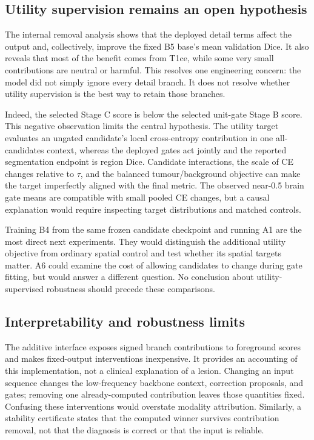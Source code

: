 \documentclass[conference]{IEEEtran}
\begin{document}
\subsection{Utility supervision remains an open hypothesis}
The internal removal analysis shows that the deployed detail terms affect the output and, collectively, improve the fixed B5 base's mean validation Dice. It also reveals that most of the benefit comes from T1ce, while some very small contributions are neutral or harmful. This resolves one engineering concern: the model did not simply ignore every detail branch. It does not resolve whether utility supervision is the best way to retain those branches.

Indeed, the selected Stage C score is below the selected unit-gate Stage B score. This negative observation limits the central hypothesis. The utility target evaluates an ungated candidate's local cross-entropy contribution in one all-candidates context, whereas the deployed gates act jointly and the reported segmentation endpoint is region Dice. Candidate interactions, the scale of CE changes relative to $\tau$, and the balanced tumour/background objective can make the target imperfectly aligned with the final metric. The observed near-0.5 brain gate means are compatible with small pooled CE changes, but a causal explanation would require inspecting target distributions and matched controls.

Training B4 from the same frozen candidate checkpoint and running A1 are the most direct next experiments. They would distinguish the additional utility objective from ordinary spatial control and test whether its spatial targets matter. A6 could examine the cost of allowing candidates to change during gate fitting, but would answer a different question. No conclusion about utility-supervised robustness should precede these comparisons.

\subsection{Interpretability and robustness limits}
The additive interface exposes signed branch contributions to foreground scores and makes fixed-output interventions inexpensive. It provides an accounting of this implementation, not a clinical explanation of a lesion. Changing an input sequence changes the low-frequency backbone context, correction proposals, and gates; removing one already-computed contribution leaves those quantities fixed. Confusing these interventions would overstate modality attribution. Similarly, a stability certificate states that the computed winner survives contribution removal, not that the diagnosis is correct or that the input is reliable.
\end{document}

